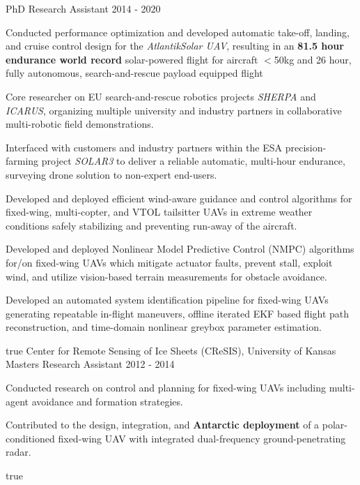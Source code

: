 \begin{cventries}
  	{PhD Research Assistant} %
    {} %
    {2014 - 2020} %
    {
      \begin{cvitems} %
      	\item Conducted performance optimization and developed automatic take-off, landing, and cruise control design for the \emph{AtlantikSolar UAV}, resulting in an \textbf{81.5 hour endurance world record} solar-powered flight for aircraft $<$50kg  and 26 hour, fully autonomous, search-and-rescue payload equipped flight 
      	\item Core researcher on EU search-and-rescue robotics projects \emph{SHERPA} and \emph{ICARUS}, organizing multiple university and industry partners in collaborative multi-robotic field demonstrations. 
      	\item Interfaced with customers and industry partners within the ESA precision-farming project \emph{SOLAR3} to deliver a reliable automatic, multi-hour endurance, surveying drone solution to non-expert end-users.
      	\item Developed and deployed efficient wind-aware guidance and control algorithms for fixed-wing, multi-copter, and VTOL tailsitter UAVs in extreme weather conditions safely stabilizing and preventing run-away of the aircraft.
      	\item Developed and deployed Nonlinear Model Predictive Control (NMPC) algorithms for/on fixed-wing UAVs which mitigate actuator faults, prevent stall, exploit wind, and utilize vision-based terrain measurements for obstacle avoidance.
      	\item Developed an automated system identification pipeline for fixed-wing UAVs generating repeatable in-flight maneuvers, offline iterated EKF based flight path reconstruction, and time-domain nonlinear greybox parameter estimation.
      \end{cvitems}
    } %
    {} %
    {true}
    {}
%   
\cvexpentry
  	{Center for Remote Sensing of Ice Sheets (CReSIS), University of Kansas} %
  	{Masters Research Assistant} %
    {} %
    {2012 - 2014} %
    {
      \begin{cvitems} %
      	\item Conducted research on control and planning for fixed-wing UAVs including multi-agent avoidance and formation strategies.
      	\item Contributed to the design, integration, and \textbf{Antarctic deployment} of a polar-conditioned fixed-wing UAV with integrated dual-frequency ground-penetrating radar.
      \end{cvitems}
    } %
    {} %
    {true}
    {}
\end{cventries}
